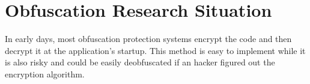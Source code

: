 \section{Obfuscation Research Situation}
In early days, most obfuscation protection systems encrypt the code and then decrypt it at the application's startup. This method is easy to implement while it is also risky and could be easily deobfuscated if an hacker figured out the encryption algorithm.

